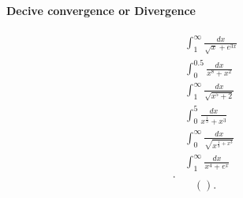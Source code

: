 \documentclass[a4paper]{article}
\begin{document}
\paragraph{Decive convergence or Divergence}%
\label{par:Decive convergence or Divergence}

\begin{align*}
 &\int_{1}^{\infty} \frac{dx}{\sqrt{x}+e^{3x}} \\
 &\int_{0}^{0.5} \frac{dx}{x^{8}+x^2} \\
 &\int_{1}^{\infty} \frac{dx}{\sqrt{x^{5}+2}} \\
 &\int_{0}^{5} \frac{dx}{x^{\frac{1}{3}}+x^3} \\
 &\int_{0}^{\infty} \frac{dx}{\sqrt{x^{\frac{1}{3}+x^3}}} \\
 &\int_{1}^{\infty} \frac{dx}{x^{4}+e^{x}}\\
.\end{align*}
\[
  \left(  \right) 
.\] 
\end{document}

